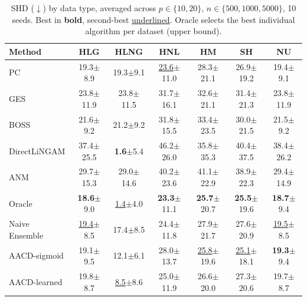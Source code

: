 \documentclass{article}
\newcommand{\aacd}{\textsc{AACD}}
\begin{document}
\begin{table}[t]
\caption{SHD ($\downarrow$) by data type, averaged across $p \in \{10, 20\}$, $n \in \{500, 1000, 5000\}$, 10 seeds. Best in \textbf{bold}, second-best \underline{underlined}. Oracle selects the best individual algorithm per dataset (upper bound).}
\label{tab:main_shd}
\centering
\small
\begin{tabular}{lcccccc}
\toprule
Method & HLG & HLNG & HNL & HM & SH & NU \\
\midrule
PC              & 19.3{\scriptsize$\pm$8.9}  & 19.3{\scriptsize$\pm$9.1}  & \underline{23.6}{\scriptsize$\pm$11.0} & 28.3{\scriptsize$\pm$21.1} & 26.9{\scriptsize$\pm$19.2} & 19.4{\scriptsize$\pm$9.1}  \\
GES             & 23.8{\scriptsize$\pm$11.9} & 23.8{\scriptsize$\pm$11.5} & 31.7{\scriptsize$\pm$16.1} & 32.6{\scriptsize$\pm$21.1} & 31.4{\scriptsize$\pm$21.3} & 23.8{\scriptsize$\pm$11.9} \\
BOSS            & 21.6{\scriptsize$\pm$9.2}  & 21.2{\scriptsize$\pm$9.2}  & 31.8{\scriptsize$\pm$15.5} & 33.4{\scriptsize$\pm$23.5} & 30.0{\scriptsize$\pm$21.5} & 21.5{\scriptsize$\pm$9.2}  \\
DirectLiNGAM    & 37.4{\scriptsize$\pm$25.5} & \textbf{1.6}{\scriptsize$\pm$5.4}   & 46.2{\scriptsize$\pm$26.0} & 35.8{\scriptsize$\pm$35.3} & 40.4{\scriptsize$\pm$37.5} & 38.4{\scriptsize$\pm$26.2} \\
ANM             & 29.7{\scriptsize$\pm$15.3} & 29.0{\scriptsize$\pm$14.6} & 40.2{\scriptsize$\pm$23.6} & 41.1{\scriptsize$\pm$22.9} & 38.9{\scriptsize$\pm$22.3} & 29.4{\scriptsize$\pm$14.9} \\
\midrule
Oracle          & \textbf{18.6}{\scriptsize$\pm$9.0}  & \underline{1.4}{\scriptsize$\pm$4.0}   & \textbf{23.3}{\scriptsize$\pm$11.1} & \textbf{25.7}{\scriptsize$\pm$20.7} & \textbf{25.5}{\scriptsize$\pm$19.6} & \textbf{18.7}{\scriptsize$\pm$9.4}  \\
Naive Ensemble  & \underline{19.4}{\scriptsize$\pm$8.5}  & 17.4{\scriptsize$\pm$8.5}  & 24.4{\scriptsize$\pm$11.8} & 27.9{\scriptsize$\pm$21.7} & 27.6{\scriptsize$\pm$20.9} & \underline{19.5}{\scriptsize$\pm$8.5}  \\
\aacd{}-sigmoid & 19.1{\scriptsize$\pm$9.5}  & 12.1{\scriptsize$\pm$6.1}  & 28.0{\scriptsize$\pm$13.7} & \underline{25.8}{\scriptsize$\pm$19.6} & \underline{25.1}{\scriptsize$\pm$18.1} & \textbf{19.3}{\scriptsize$\pm$9.4}  \\
\aacd{}-learned & 19.8{\scriptsize$\pm$8.7}  & \underline{8.5}{\scriptsize$\pm$8.6}   & 25.0{\scriptsize$\pm$11.9} & 26.6{\scriptsize$\pm$20.0} & 27.3{\scriptsize$\pm$20.6} & 19.7{\scriptsize$\pm$8.7}  \\
\bottomrule
\end{tabular}
\end{table}
\end{document}
